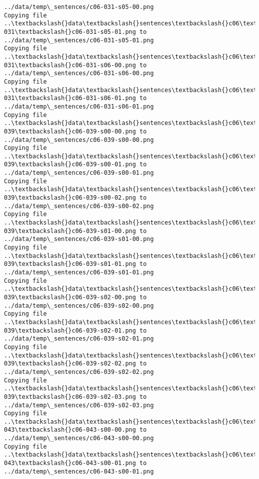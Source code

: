 \documentclass[11pt]{article}
\begin{document}
\begin{Verbatim}[commandchars=\\\{\}]
../data/temp\_sentences/c06-031-s05-00.png
Copying file ..\textbackslash{}data\textbackslash{}sentences\textbackslash{}c06\textbackslash{}c06-031\textbackslash{}c06-031-s05-01.png to
../data/temp\_sentences/c06-031-s05-01.png
Copying file ..\textbackslash{}data\textbackslash{}sentences\textbackslash{}c06\textbackslash{}c06-031\textbackslash{}c06-031-s06-00.png to
../data/temp\_sentences/c06-031-s06-00.png
Copying file ..\textbackslash{}data\textbackslash{}sentences\textbackslash{}c06\textbackslash{}c06-031\textbackslash{}c06-031-s06-01.png to
../data/temp\_sentences/c06-031-s06-01.png
Copying file ..\textbackslash{}data\textbackslash{}sentences\textbackslash{}c06\textbackslash{}c06-039\textbackslash{}c06-039-s00-00.png to
../data/temp\_sentences/c06-039-s00-00.png
Copying file ..\textbackslash{}data\textbackslash{}sentences\textbackslash{}c06\textbackslash{}c06-039\textbackslash{}c06-039-s00-01.png to
../data/temp\_sentences/c06-039-s00-01.png
Copying file ..\textbackslash{}data\textbackslash{}sentences\textbackslash{}c06\textbackslash{}c06-039\textbackslash{}c06-039-s00-02.png to
../data/temp\_sentences/c06-039-s00-02.png
Copying file ..\textbackslash{}data\textbackslash{}sentences\textbackslash{}c06\textbackslash{}c06-039\textbackslash{}c06-039-s01-00.png to
../data/temp\_sentences/c06-039-s01-00.png
Copying file ..\textbackslash{}data\textbackslash{}sentences\textbackslash{}c06\textbackslash{}c06-039\textbackslash{}c06-039-s01-01.png to
../data/temp\_sentences/c06-039-s01-01.png
Copying file ..\textbackslash{}data\textbackslash{}sentences\textbackslash{}c06\textbackslash{}c06-039\textbackslash{}c06-039-s02-00.png to
../data/temp\_sentences/c06-039-s02-00.png
Copying file ..\textbackslash{}data\textbackslash{}sentences\textbackslash{}c06\textbackslash{}c06-039\textbackslash{}c06-039-s02-01.png to
../data/temp\_sentences/c06-039-s02-01.png
Copying file ..\textbackslash{}data\textbackslash{}sentences\textbackslash{}c06\textbackslash{}c06-039\textbackslash{}c06-039-s02-02.png to
../data/temp\_sentences/c06-039-s02-02.png
Copying file ..\textbackslash{}data\textbackslash{}sentences\textbackslash{}c06\textbackslash{}c06-039\textbackslash{}c06-039-s02-03.png to
../data/temp\_sentences/c06-039-s02-03.png
Copying file ..\textbackslash{}data\textbackslash{}sentences\textbackslash{}c06\textbackslash{}c06-043\textbackslash{}c06-043-s00-00.png to
../data/temp\_sentences/c06-043-s00-00.png
Copying file ..\textbackslash{}data\textbackslash{}sentences\textbackslash{}c06\textbackslash{}c06-043\textbackslash{}c06-043-s00-01.png to
../data/temp\_sentences/c06-043-s00-01.png

\end{Verbatim}
\end{document}
